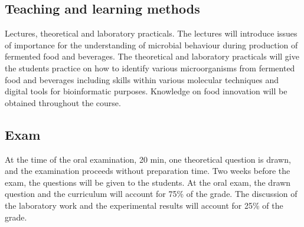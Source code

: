 \subsection{Teaching and learning methods}

Lectures, theoretical and laboratory practicals. The lectures will introduce issues of importance for the understanding of microbial behaviour during production of fermented food and beverages. The theoretical and laboratory practicals will give the students practice on how to identify various microorganisms from fermented food and beverages including skills within various molecular techniques and digital tools for bioinformatic purposes. Knowledge on food innovation will be obtained throughout the course.

\subsection{Exam}

At the time of the oral examination, 20 min, one theoretical question is drawn, and the examination proceeds without preparation time. Two weeks before the exam, the questions will be given to the students. At the oral exam, the drawn question and the curriculum will account for 75\% of the grade. The discussion of the laboratory work and the experimental results will account for 25\% of the grade.
